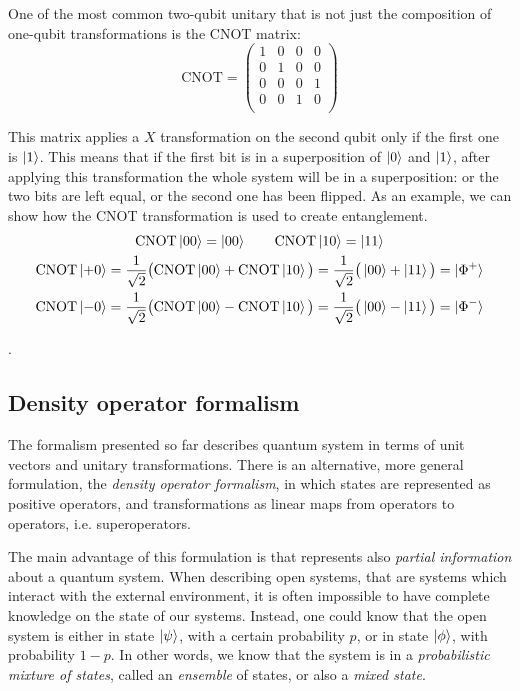 \documentclass[10pt,a4paper, titlepage]{report}
\theoremstyle{definition}
\newcommand{\kp}{\ket{\psi}}
\newcommand{\kf}{\ket{\phi}}
\newcommand{\kz}{\ket{0}}
\newcommand{\ko}{\ket{1}}
\newcommand{\oost}{\frac{1}{\sqrt{2}}}
\newcommand{\cnot}{\text{CNOT}}
\begin{document}
One of the most common two-qubit unitary that is not just the composition of one-qubit transformations is the CNOT matrix:
\[\text{CNOT} = 
\begin{pmatrix}
1 & 0 & 0 & 0 \\
0 & 1 & 0 & 0 \\
0 & 0 & 0 & 1 \\
0 & 0 & 1 & 0 \\
\end{pmatrix}
\]

This matrix applies a $X$ transformation on the second qubit only if the first one is $\ko$. This means that if the first bit is in a superposition of $\kz$ and $\ko$, after applying this transformation the whole system will be in a superposition: or the two bits are left equal, or the second one has been flipped. As an example, we can show how the CNOT transformation is used to create entanglement.
\begin{gather*}
\cnot \ket{00} = \ket{00} \qquad \cnot \ket{10} = \ket{11} \\
\cnot \ket{+0} = \oost\big(\cnot\ket{00} + \cnot\ket{10}\big) = \oost
\big(\ket{00} + \ket{11}\big) = \ket{\Phi^+}\\
\cnot \ket{-0} = \oost\big(\cnot\ket{00} - \cnot\ket{10}\big) = \oost
\big(\ket{00} - \ket{11}\big) = \ket{\Phi^-}
\end{gather*}

.\subsection{Density operator formalism}

The formalism presented so far describes quantum system in terms of unit vectors and unitary transformations. There is an alternative, more general formulation, the \textit{density operator formalism}, in which states are represented as positive operators, and transformations as linear maps from operators to operators, i.e. superoperators.

The main advantage of this formulation is that represents also \textit{partial information} about a quantum system. When describing open systems, that are systems which interact with the external environment, it is often impossible to have complete knowledge on the state of our systems. Instead, one could know that the open system is either in state $\kp$, with a certain probability $p$, or in state $\kf$, with probability $1-p$. In other words, we know that the system is in a \textit{probabilistic mixture of states}, called an \textit{ensemble} of states, or also a \textit{mixed state}.
\end{document}
